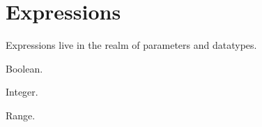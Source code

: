 

\chapter{Expressions}
\label{sec:expressions}

Expressions live in the realm of parameters and datatypes.  

Boolean.

Integer.

Range.  

